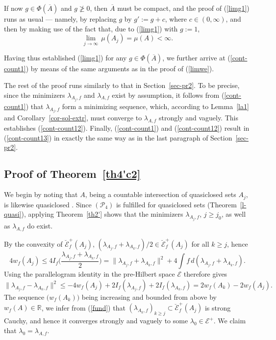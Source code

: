 \documentclass[12pt,a4paper,reqno]{amsart} %
\theoremstyle{lause}
\theoremstyle{maaritelma}
\theoremstyle{lause}
\theoremstyle{maaritelma}
\numberwithin{equation}{section}
\begin{document}
If now $g\in\Phi(\overline{A})$ and $g\ngeqslant0$, then $\overline{A}$ must be compact, and the proof of (\ref{limg1}) runs as usual --- namely, by replacing $g$ by $g':=g+c$, where $c\in(0,\infty)$, and then by making use of the fact that, due to (\ref{limg1}) with $g:=1$,
\[\lim_{j\to\infty}\,\mu(A_j)=\mu(A)<\infty.\]

Having thus established (\ref{limg1}) for any $g\in\Phi(\overline{A})$, we further arrive at (\ref{cont-count1}) by means of the same arguments as in the proof of (\ref{limwe}).

The rest of the proof runs similarly to that in Section~\ref{sec-pr2}.
To be precise, since the minimizers $\lambda_{A_j,f}$ and $\lambda_{A,f}$ exist by assumption, it follows from (\ref{cont-count1}) that $\lambda_{A_j,f}$ form a minimizing sequence,
which, according to Lemma~\ref{la1} and Corollary~\ref{cor-sol-extr}, must converge to $\lambda_{A,f}$ strongly and vaguely. This establishes (\ref{cont-count12}). Finally, (\ref{cont-count1}) and (\ref{cont-count12}) result in (\ref{cont-count13}) in exactly the same way as in the last paragraph of Section~\ref{sec-pr2}.

\subsection{Proof of Theorem~\ref{th4'c2}}\label{sec-pr2c2} We begin by noting that $A$, being a countable intersection of quasiclosed sets $A_j$, is likewise quasiclosed \cite[Lemma~2.3]{F71}. Since $(\mathcal P_4)$ is fulfilled for quasiclosed sets (Theorem~\ref{l-quasi}), applying Theorem~\ref{th2'} shows that the minimizers $\lambda_{A_j,f}$, $j\geqslant j_0$, as well as $\lambda_{A,f}$ do exist.

By the convexity of $\breve{\mathcal E}^+_f(A_j)$, $(\lambda_{A_j,f}+\lambda_{A_k,f})/2\in\breve{\mathcal E}^+_f(A_j)$ for all  $k\geqslant j$, hence
\[4w_f(A_j)\leqslant4I_f\biggl(\frac{\lambda_{A_j,f}+\lambda_{A_k,f}}{2}\biggr)=\|\lambda_{A_j,f}+\lambda_{A_k,f}\|^2+4\int f\,d(\lambda_{A_j,f}+\lambda_{A_k,f}).\]
Using the parallelogram identity in the pre-Hilbert space $\mathcal E$ therefore gives
\begin{equation}\label{fund}
\|\lambda_{A_j,f}-\lambda_{A_k,f}\|^2\leqslant-4w_f(A_j)+2I_f(\lambda_{A_j,f})+2I_f(\lambda_{A_k,f})=2w_f(A_k)-2w_f(A_j).
\end{equation}
The sequence $\bigl(w_f(A_k)\bigr)$ being increasing and bounded from above by $w_f(A)\in\mathbb R$, we infer from (\ref{fund}) that $(\lambda_{A_k,f})_{k\geqslant j}\subset\breve{\mathcal E}_f^+(A_j)$ is strong Cauchy, and hence it converges strongly and vaguely to some $\lambda_0\in\mathcal E^+$. We claim that
$\lambda_0=\lambda_{A,f}$.
\end{document}
